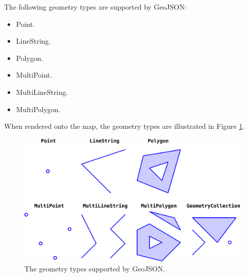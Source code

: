 The following geometry types are supported by GeoJSON:
\begin{itemize}
    \item Point.
    \item LineString.
    \item Polygon.
    \item MultiPoint.
    \item MultiLineString.
    \item MultiPolygon.
\end{itemize}

When rendered onto the map, the geometry types are illustrated in Figure \ref{fig:geojson_geometry}.

\begin{figure}[H]
    \centering
    \includegraphics[width=\textwidth]{assets/images/Research/geojson/geojson_features.png}
    \caption{The geometry types supported by GeoJSON.}
    \label{fig:geojson_geometry}
\end{figure}

